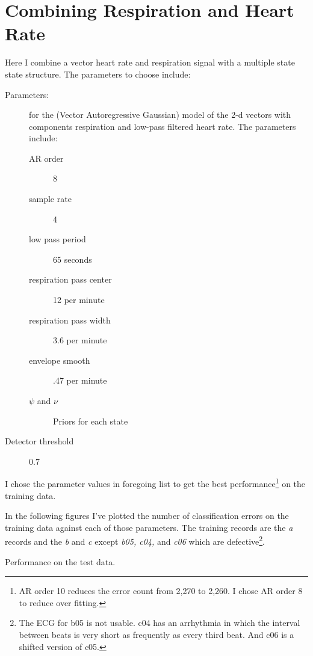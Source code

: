 \documentclass[12pt]{article}
\begin{document}
\section{Combining Respiration and Heart Rate}
\label{sec:combination}

Here I combine a vector heart rate and respiration signal with a
multiple state state structure.  The parameters to choose include:
\begin{description}
\item[Parameters:] for the (Vector Autoregressive Gaussian) model
  of the 2-d vectors with components respiration and low-pass filtered
  heart rate.  The parameters include:
  \begin{description}
  \item[AR order] 8 %
  \item[sample rate] 4 %
  \item[low pass period] 65 seconds %
  \item[respiration pass center] 12 per minute %
  \item[respiration pass width] 3.6 per minute %
  \item[envelope smooth] .47 per minute %
  \item[$\psi$ and $\nu$] Priors for each state
  \end{description}
\item[Detector threshold] 0.7 %
\end{description}

I chose the parameter values in foregoing list to get the best
performance\footnote{AR order 10 reduces the error count from 2,270 to
  2,260.  I chose AR order 8 to reduce over fitting.} on the training
data.

In the following figures I've plotted the number of classification
errors on the training data against each of those parameters.  The
training records are the \emph{a} records and the \emph{b} and
\emph{c} except \emph{b05, c04,} and \emph{c06} which are
defective\footnote{The ECG for b05 is not usable.  c04 has an
  arrhythmia in which the interval between beats is very short as
  frequently as every third beat.  And c06 is a shifted version of
  c05.}.


\begin{table*}
  \centering
  
  \caption[Performance]{Performance on the test data.}
  \label{tab:test_score}
\end{table*}
\end{document}

